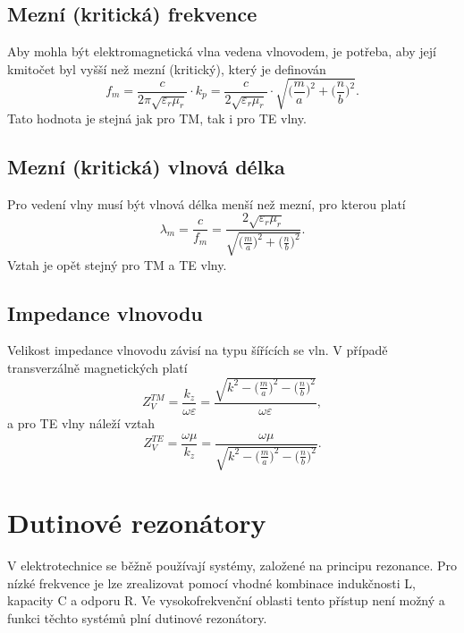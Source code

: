 \subsection*{Mezní (kritická) frekvence}
Aby mohla být elektromagnetická vlna vedena vlnovodem, je potřeba, aby její kmitočet byl vyšší než mezní (kritický), který je definován
\begin{equation}
f_{m} = \frac{c}{2\pi\sqrt{\varepsilon_{r}\mu_{r}}}\cdot k_p = \frac{c}{2\sqrt{\varepsilon_{r}\mu_{r}}}\cdot \sqrt{\bigg(\frac{m}{a}\bigg)^{2} + \bigg(\frac{n}{b}\bigg)^{2}}. 
	\label{rce:evlny_vlnovody_mezni_frekvence}
\end{equation}
Tato hodnota je stejná jak pro TM, tak i pro TE vlny.
\subsection*{Mezní (kritická) vlnová délka}
Pro vedení vlny musí být vlnová délka menší než mezní, pro kterou platí
\begin{equation}
\lambda_{m} = \frac{c}{f_{m}} = \frac{2\sqrt{\varepsilon_{r}\mu_{r}}}{\sqrt{\big(\frac{m}{a}\big)^{2} + \big(\frac{n}{b}\big)^{2}}}. 
	\label{rce:evlny_vlnovody_mezni_vlnova_delka}
\end{equation}
Vztah je opět stejný pro TM a TE vlny.
\subsection*{Impedance vlnovodu}
Velikost impedance vlnovodu závisí na typu šířících se vln. V případě transverzálně magnetických platí
\begin{displaymath}
Z_{V}^{TM} = \frac{k_z}{\omega\varepsilon} = \frac{\sqrt{k^{2} - \big(\frac{m}{a}\big)^{2} - \big(\frac{n}{b}\big)^{2}}}{\omega\varepsilon},
\end{displaymath}
a pro TE vlny náleží vztah
\begin{displaymath}
	Z_{V}^{TE} = \frac{\omega\mu}{k_z} = \frac{\omega\mu}{\sqrt{k^{2} - \big(\frac{m}{a}\big)^{2} - \big(\frac{n}{b}\big)^{2}}}.
\end{displaymath}

\section{Dutinové rezonátory}
V elektrotechnice se běžně používají systémy, založené na principu rezonance. Pro nízké frekvence je lze zrealizovat pomocí vhodné kombinace indukčnosti L, kapacity C a odporu R. Ve vysokofrekvenční oblasti tento přístup není možný a funkci těchto systémů plní dutinové rezonátory. 


